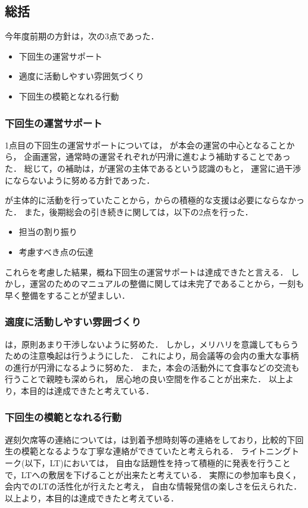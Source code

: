 \subsection*{\thirdGrade{}総括}


今年度前期の\thirdGrade{}方針は，次の3点であった．
\begin {itemize}
	\item 下回生の運営サポート
	\item 適度に活動しやすい雰囲気づくり
    \item 下回生の模範となれる行動
\end {itemize}

\subsubsection{下回生の運営サポート}

1点目の下回生の運営サポートについては，
\secondGrade{}が本会の運営の中心となることから，
企画運営，通常時の運営それぞれが円滑に進むよう補助することであった．
総じて，\thirdGrade{}の補助は，\secondGrade{}が運営の主体であるという認識のもと，
運営に過干渉にならないように努める方針であった．

\secondGrade{}が主体的に活動を行っていたことから，\thirdGrade{}からの積極的な支援は必要にならなかった．
また，後期総会の引き続きに関しては，以下の2点を行った．

\begin {itemize}
	\item 担当の割り振り
	\item 考慮すべき点の伝達
\end {itemize}

これらを考慮した結果，概ね下回生の運営サポートは達成できたと言える．
しかし，運営のためのマニュアルの整備に関しては未完了であることから，一刻も早く整備をすることが望ましい．

\subsubsection{適度に活動しやすい雰囲づくり}
\thirdGrade{}は，原則あまり干渉しないように努めた．
しかし，メリハリを意識してもらうための注意喚起は行うようにした．
これにより，局会議等の会内の重大な事柄の進行が円滑になるように努めた．
また，本会の活動外にて食事などの交流も行うことで親睦も深められ，
居心地の良い空間を作ることが出来た．
以上より，本目的は達成できたと考えている．

\subsubsection{下回生の模範となれる行動}
遅刻欠席等の連絡については，\thirdGrade{}は到着予想時刻等の連絡をしており，比較的下回生の模範となるような丁寧な連絡ができていたと考えられる．
ライトニングトーク(以下，LT)においては，
自由な話題性を持って積極的に発表を行うことで，LTへの敷居を下げることが出来たと考えている．
実際に\firstGrade{}の参加率も良く，会内でのLTの活性化が行えたと考え，
自由な情報発信の楽しさを伝えられた．
以上より，本目的は達成できたと考えている．

